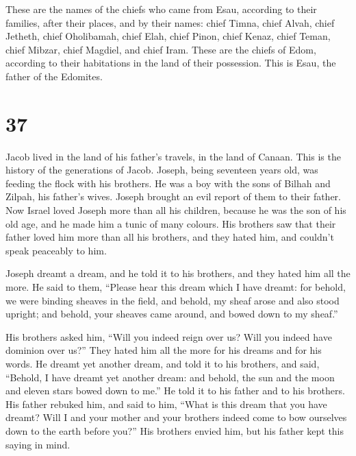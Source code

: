  These are the names of the chiefs who came from Esau,
according to their families, after their places, and by their names:
chief Timna, chief Alvah, chief Jetheth,  chief
Oholibamah, chief Elah, chief Pinon,  chief Kenaz, chief
Teman, chief Mibzar,  chief Magdiel, and chief Iram.
These are the chiefs of Edom, according to their habitations in the land
of their possession. This is Esau, the father of the Edomites.

\hypertarget{section-36}{%
\section{37}\label{section-36}}

 Jacob lived in the land of his father's travels, in the
land of Canaan.  This is the history of the generations of
Jacob. Joseph, being seventeen years old, was feeding the flock with his
brothers. He was a boy with the sons of Bilhah and Zilpah, his father's
wives. Joseph brought an evil report of them to their father.
 Now Israel loved Joseph more than all his children,
because he was the son of his old age, and he made him a tunic of many
colours.  His brothers saw that their father loved him
more than all his brothers, and they hated him, and couldn't speak
peaceably to him.

 Joseph dreamt a dream, and he told it to his brothers,
and they hated him all the more.  He said to them,
``Please hear this dream which I have dreamt:  for behold,
we were binding sheaves in the field, and behold, my sheaf arose and
also stood upright; and behold, your sheaves came around, and bowed down
to my sheaf.''

 His brothers asked him, ``Will you indeed reign over us?
Will you indeed have dominion over us?'' They hated him all the more for
his dreams and for his words.  He dreamt yet another
dream, and told it to his brothers, and said, ``Behold, I have dreamt
yet another dream: and behold, the sun and the moon and eleven stars
bowed down to me.''  He told it to his father and to his
brothers. His father rebuked him, and said to him, ``What is this dream
that you have dreamt? Will I and your mother and your brothers indeed
come to bow ourselves down to the earth before you?'' 
His brothers envied him, but his father kept this saying in mind.

